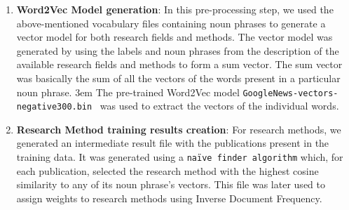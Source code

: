\documentclass[runningheads]{llncs}
\begin{document}
\begin{enumerate}
    \smallskip
    \item \textbf{Word2Vec Model generation}: In this pre-processing step, we used the above-mentioned vocabulary files containing noun phrases to generate a vector model for both research fields and methods. %
    The vector model was generated by using the labels and noun phrases from the description of the available research fields and methods to form a sum vector. 
    The sum vector was basically the sum of all the vectors of the words present in a particular noun phrase. %
    \emergencystretch 3em {The pre-trained Word2Vec model \texttt{GoogleNews-vectors-negative300.bin}~\cite{DBLP:journals/corr/abs-1301-3781} was used to extract the vectors of the individual words.}
    \smallskip
    \item \textbf{Research Method training results creation}: For research methods, we generated an intermediate %
    result file with the publications present in the training data. %
    It was generated using a \texttt{naïve finder algorithm} which, for each publication, selected the research method with the highest cosine similarity to any of its noun phrase’s vectors. This file was later used to assign weights to research methods using Inverse Document Frequency.
\end{enumerate}


\end{document}
